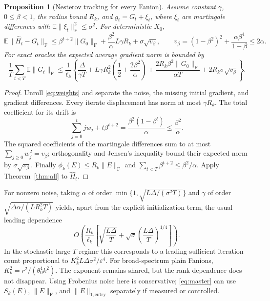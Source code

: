 \documentclass[11pt]{article}
\newtheorem{proposition}[theorem]{Proposition}
\newcommand{\E}{\mathbb E}
\newcommand{\F}[1]{\lVert #1\rVert_{\mathrm F}}
\newcommand{\ent}[1]{\lVert #1\rVert_{1,\mathrm{entry}}}
\begin{document}
\begin{proposition}[Nesterov tracking for every Fanion]\label{prop:tracking}
Assume constant $\gamma$, $0\leq\beta<1$, the radius bound $R_k$, and
$g_t=G_t+\xi_t$, where $\xi_t$ are martingale differences with
$\E\F{\xi_t}^2\leq\sigma^2$. For deterministic $X_0$,
\begin{equation}\label{eq:tracking}
 \E\F{\widehat H_t-G_t}
 \leq\beta^{t+2}\F{G_0}
       +\frac{\beta^2}{\alpha}L\gamma R_k
       +\sigma\sqrt{v_\beta},
 \qquad
 v_\beta=(1-\beta^2)^2+\frac{\alpha\beta^4}{1+\beta}
 \leq2\alpha.
\end{equation}
For exact oracles the expected average gradient norm is bounded by
\begin{equation}\label{eq:nesterovbound}
 \frac1T\sum_{t<T}\E\F{G_t}
 \leq\frac1{\ell_k}\left\{
 \frac{\Delta}{\gamma T}
 +L\gamma R_k^2\left(\frac12+\frac{2\beta^2}{\alpha}\right)
 +\frac{2R_k\beta^2\F{G_0}}{\alpha T}
 +2R_k\sigma\sqrt{v_\beta}\right\}.
\end{equation}
\end{proposition}

\begin{proof}
Unroll \eqref{eq:weights} and separate the noise, the missing initial
gradient, and gradient differences. Every iterate displacement has norm at
most $\gamma R_k$. The total coefficient for its drift is
\[
 \sum_{j=0}^t jw_j+t\beta^{t+2}
 =\frac{\beta^2(1-\beta^t)}{\alpha}
 \leq\frac{\beta^2}{\alpha}.
\]
The squared coefficients of the martingale differences sum to at most
$\sum_{j\geq0}w_j^2=v_\beta$; orthogonality and Jensen's inequality bound
their expected norm by $\sigma\sqrt{v_\beta}$.
Finally $\phi_k(E)\leq R_k\F{E}$ and
$\sum_{t<T}\beta^{t+2}\leq\beta^2/\alpha$. Apply
Theorem~\ref{thm:all} to $\widehat H_t$.
\end{proof}

For nonzero noise, taking
$\alpha$ of order $\min\{1,\sqrt{L\Delta/(\sigma^2T)}\}$ and
$\gamma$ of order $\sqrt{\Delta\alpha/(LR_k^2T)}$ yields, apart from the
explicit initialization term, the usual leading dependence
\[
 O\left(\frac{R_k}{\ell_k}
 \left[\sqrt{\frac{L\Delta}{T}}
       +\sqrt\sigma\left(\frac{L\Delta}{T}\right)^{1/4}\right]\right).
\]
In the stochastic large-$T$ regime this corresponds to a leading sufficient
iteration count proportional to $K_k^2L\Delta\sigma^2/\varepsilon^4$.
For broad-spectrum plain Fanions, $K_k^2=r^2/(\theta_0^4k^2)$.
The exponent remains shared, but the rank dependence does not disappear.
Using Frobenius noise here is conservative; \eqref{eq:master} can use
$S_k(E)$, $\F{E}$, and $\ent{E}$ separately if measured or controlled.
\end{document}
